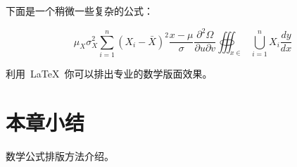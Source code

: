 下面是一个稍微一些复杂的公式：

\begin{equation}
  {\mu _X}\sigma _X^2\sum\limits_{i = 1}^n {{{({X_i} - \bar X)}^2}} \frac{{x - \mu }}{\sigma }\frac{{{\partial ^2}\Omega }}{{\partial u\partial v}}\oiiint\nolimits_{x \in }
  {\bigcup\limits_{i = 1}^n {{X_i}} \frac{{dy}}{{dx}}}
\end{equation}

利用~\LaTeX~你可以排出专业的数学版面效果。


\section*{本章小结}
数学公式排版方法介绍。
